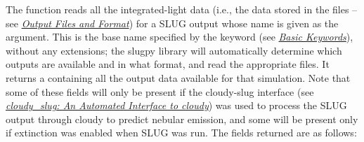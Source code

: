 \documentclass[letterpaper,10pt,english]{sphinxmanual}
\begin{document}
The  function reads all the integrated-light data (i.e., the data stored in the  files -- see {\hyperref[output:sec-output]{\emph{Output Files and Format}}}) for a SLUG output whose name is given as the argument. This is the base name specified by the  keyword (see {\hyperref[parameters:ssec-basic-keywords]{\emph{Basic Keywords}}}), without any extensions; the slugpy library will automatically determine which outputs are available and in what format, and read the appropriate files. It returns a  containing all the output data available for that simulation. Note that some of these fields will only be present if the cloudy-slug interface (see {\hyperref[cloudy:sec-cloudy-slug]{\emph{cloudy\_slug: An Automated Interface to cloudy}}}) was used to process the SLUG output through cloudy to predict nebular emission, and some will be present only if extinction was enabled when SLUG was run. The fields returned are as follows:
\end{document}
